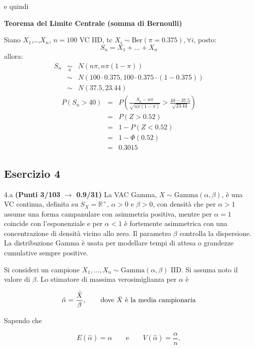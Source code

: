 \documentclass[
  11pt,
]{book}
\theoremstyle{mytheoremstyle}
\theoremstyle{mydefstyle}
\begin{document}
e quindi

\textbf{Teorema del Limite Centrale (somma di Bernoulli)}

Siano \(X_1\),\ldots,\(X_n\), \(n=100\) VC IID, tc \(X_i\sim\text{Ber}(\pi=0.375)\)\(,\forall i\), posto:
\[
      S_n = X_1 + ... + X_n
      \]
allora:\begin{eqnarray*}
  S_n & \mathop{\sim}\limits_{a}& N(n\pi,n\pi(1-\pi)) \\
      &\sim & N(100\cdot0.375,100\cdot0.375\cdot(1-0.375)) \\
      &\sim & N(37.5,23.44)
  \end{eqnarray*}\begin{eqnarray*}
      P( S_n   >   40 ) 
        &=& P\left(  \frac { S_n  -  n\pi }{ \sqrt{n\pi(1-\pi)} }  >  \frac { 40  -  37.5 }{\sqrt{ 23.44 }} \right)  \\
                 &=& P\left(  Z   >   0.52 \right) \\    &=& 1-P(Z< 0.52 )\\ 
                 &=&  1-\Phi( 0.52 ) \\ &=&  0.3015 
      \end{eqnarray*}

\subsection{Esercizio 4}\label{esercizio-4-44}

4.a \textbf{(Punti 3/103 \(\rightarrow\) 0.9/31)} La VAC Gamma, \(X \sim \text{Gamma}(\alpha, \beta)\), è una VC continua, definita su \(S_X = \mathbb{R}^+\), \(\alpha > 0\) e \(\beta > 0\), con densità che per \(\alpha > 1\) assume una forma campanulare con asimmetria positiva, mentre per \(\alpha = 1\) coincide con l'esponenziale e per \(\alpha < 1\) è fortemente asimmetrica con una concentrazione di densità vicino allo zero. Il parametro \(\beta\) controlla la dispersione. La distribuzione Gamma è usata per modellare tempi di attesa o grandezze cumulative sempre positive.

Si consideri un campione \(X_1,\dots,X_n \sim \text{Gamma}(\alpha,\beta)\) IID. Si assuma noto il valore di \(\beta\). Lo stimatore di massima verosimiglianza per \(\alpha\) è

\[
\hat\alpha = \frac{\bar X}{\beta}, \qquad \text{dove \( \bar X \) è la media campionaria}
\]

Sapendo che

\[
E(\hat\alpha) = \alpha \qquad \text{e} \qquad V(\hat\alpha) = \frac{\alpha}{n},
\]
\end{document}
